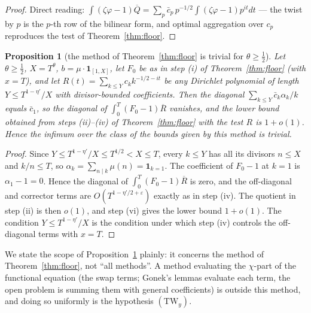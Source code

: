 \documentclass[11pt]{amsart}
\theoremstyle{plain}
\newtheorem{proposition}[theorem]{Proposition}
\theoremstyle{definition}
\theoremstyle{remark}
\begin{document}
\begin{proof}
Direct reading: $\int(\zeta\varphi-1)\overline Q=\sum_p\bar c_p\,p^{-1/2}\int(\zeta\varphi-1)p^{it}dt$ --- the twist by $p$ is the $p$-th row of the bilinear form, and optimal aggregation over $c_p$ reproduces the test of Theorem~\ref{thm:floor}.
\end{proof}

\begin{proposition}[the method of Theorem~\ref{thm:floor} is trivial for $\theta\ge\tfrac12$]\label{thm:pipeline}
Let $\theta\ge\tfrac12$, $X=T^\theta$, $b=\mu\cdot\mathbf 1_{[1,X]}$, let $F_0$ be as in step \textup{(i)} of Theorem~\ref{thm:floor} \textup{(}with $x=T$\textup{)}, and let $R(t)=\sum_{k\le Y}c_kk^{-1/2-it}$ be any Dirichlet polynomial of length $Y\le T^{1-\eta'}/X$ with divisor-bounded coefficients. Then the diagonal $\sum_{k\le Y}\bar c_k\alpha_k/k$ equals $\bar c_1$, so the diagonal of $\int_0^T(F_0-1)\overline R$ vanishes, and the lower bound obtained from steps \textup{(ii)--(iv)} of Theorem~\ref{thm:floor} with the test $R$ is $1+o(1)$. Hence the infimum over the class of the bounds given by this method is trivial.
\end{proposition}

\begin{proof}
Since $Y\le T^{1-\eta'}/X\le T^{1/2}<X\le T$, every $k\le Y$ has all its divisors $n\le X$ and $k/n\le T$, so $\alpha_k=\sum_{n\mid k}\mu(n)=\mathbf 1_{k=1}$. The coefficient of $F_0-1$ at $k=1$ is $\alpha_1-1=0$. Hence the diagonal of $\int_0^T(F_0-1)\overline R$ is zero, and the off-diagonal and corrector terms are $O(T^{1-\eta'/2+\varepsilon})$ exactly as in step (iv). The quotient in step (ii) is then $o(1)$, and step (vi) gives the lower bound $1+o(1)$. The condition $Y\le T^{1-\eta'}/X$ is the condition under which step (iv) controls the off-diagonal terms with $x=T$.
\end{proof}

We state the scope of Proposition~\ref{thm:pipeline} plainly: it concerns the method of Theorem~\ref{thm:floor}, not ``all methods''. A method evaluating the $\chi$-part of the functional equation (the swap terms; Gonek's lemmas \cite{Gonek1984} evaluate each term, the open problem is summing them with general coefficients) is outside this method, and doing so uniformly is the hypothesis $(\mathrm{TW}_y)$.
\end{document}

